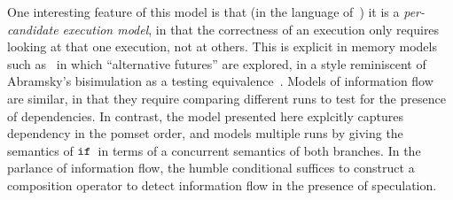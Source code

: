 
One interesting feature of this model is that (in the language
of~\cite{Pichon-Pharabod:2016:CSR:2837614.2837616}) it is a
\emph{per-candidate execution model}, in that the correctness of an
execution only requires looking at that one execution, not at
others. This is explicit in memory models such
as~\cite{Jagadeesan:2010:GOS:2175486.2175503,Kang:2017:PSR:3009837.3009850} in which
``alternative futures'' are explored, in a style reminiscent of
Abramsky's bisimulation as a testing equivalence~\cite{ABRAMSKY1987225}. Models of
information flow are similar, in that they require comparing different
runs to test for the presence of dependencies. In contrast, the model
presented here explcitly captures dependency in the pomset order, and
models multiple runs by giving the semantics of $\texttt{if}\,$ in terms of a
concurrent semantics of both branches.
In the parlance
of information flow, the humble conditional suffices to construct a composition operator to detect information flow  in the presence of speculation.
